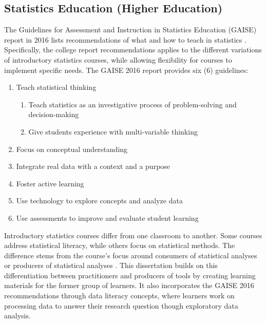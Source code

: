 \documentclass[010-intro.tex]{subfiles}
\begin{document}
\subsection{Statistics Education (Higher Education)}

    The Guidelines for Assessment and Instruction in Statistics Education (GAISE) report in 2016 lists
    recommendations of what and how to teach in statistics
    \cite{gaise2016}.
    Specifically, the college report recommendations
    applies to the different variations of introductory statistics courses,
    while allowing flexibility for courses to implement specific needs.
    The GAISE 2016 report provides six (6) guidelines:
    
    \begin{enumerate}
        \item Teach statistical thinking
        \begin{enumerate}
            \item Teach statistics as an investigative process of problem-solving and decision-making
            \item Give students experience with multi-variable thinking
        \end{enumerate}
        \item Focus on conceptual understanding
        \item Integrate real data with a context and a purpose
        \item Foster active learning
        \item Use technology to explore concepts and analyze data
        \item Use assessments to improve and evaluate student learning
    \end{enumerate}
    
    Introductory statistics courses differ from one classroom to another.
    Some courses address statistical literacy,
    while others focus on statistical methods.
    The difference stems from the course's focus around consumers of statistical analyses
    or producers of statistical analyses
    \cite{gaise2016}.
    This dissertation builds on this differentiation between practitioners and producers of tools
    by creating learning materials for the former group of learners.
    It also incorporates the GAISE 2016 recommendations through data literacy concepts,
    where learners work on processing data to answer their research question though exploratory data analysis.
    
\end{document}
